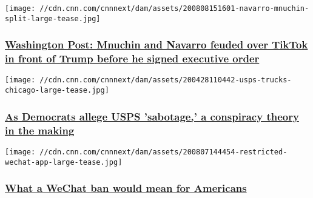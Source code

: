 \href{/2020/08/08/politics/mnuchin-navarro-tiktok/index.html}{}

\texttt{[image: //cdn.cnn.com/cnnnext/dam/assets/200808151601-navarro-mnuchin-split-large-tease.jpg]}

\hypertarget{washington-post-mnuchin-and-navarro-feuded-over-tiktok-in-front-of-trump-before-he-signed-executive-order}{%
\subsubsection{\texorpdfstring{\href{/2020/08/08/politics/mnuchin-navarro-tiktok/index.html}{Washington
Post: Mnuchin and Navarro feuded over TikTok in front of Trump before he
signed executive
order}}{Washington Post: Mnuchin and Navarro feuded over TikTok in front of Trump before he signed executive order}}\label{washington-post-mnuchin-and-navarro-feuded-over-tiktok-in-front-of-trump-before-he-signed-executive-order}}

\href{/2020/08/08/politics/usps-postal-service-democrats-allegations-sabotage/index.html}{}

\texttt{[image: //cdn.cnn.com/cnnnext/dam/assets/200428110442-usps-trucks-chicago-large-tease.jpg]}

\hypertarget{as-democrats-allege-usps-sabotage-a-conspiracy-theory-in-the-making}{%
\subsubsection{\texorpdfstring{\href{/2020/08/08/politics/usps-postal-service-democrats-allegations-sabotage/index.html}{As
Democrats allege USPS 'sabotage,' a conspiracy theory in the
making}}{As Democrats allege USPS 'sabotage,' a conspiracy theory in the making}}\label{as-democrats-allege-usps-sabotage-a-conspiracy-theory-in-the-making}}

\href{/2020/08/08/tech/wechat-chinese-americans-trump/index.html}{}

\texttt{[image: //cdn.cnn.com/cnnnext/dam/assets/200807144454-restricted-wechat-app-large-tease.jpg]}

\hypertarget{what-a-wechat-ban-would-mean-for-americans}{%
\subsubsection{\texorpdfstring{\href{/2020/08/08/tech/wechat-chinese-americans-trump/index.html}{What
a WeChat ban would mean for
Americans}}{What a WeChat ban would mean for Americans}}\label{what-a-wechat-ban-would-mean-for-americans}}

